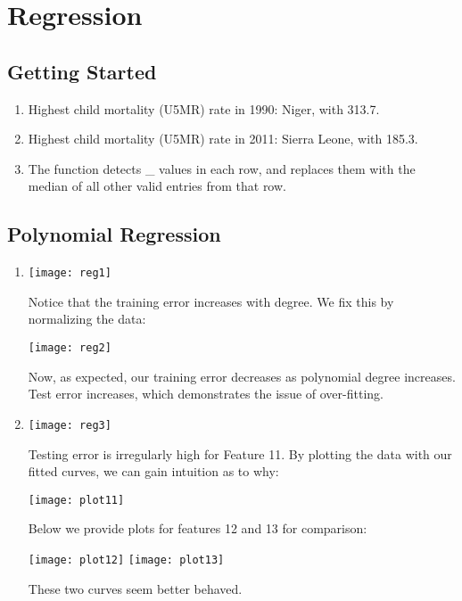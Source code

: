 \documentclass{article}
\begin{document}
\section{Regression}
\subsection{Getting Started}

\begin{enumerate}
\item Highest child mortality (U5MR) rate in 1990: Niger, with 313.7.
\item Highest child mortality (U5MR) rate in 2011: Sierra Leone, with 185.3.
\item The function detects \_ values in each row, and replaces
  them with the median of all other valid entries from that row.
\end{enumerate}

\subsection{Polynomial Regression}

\begin{enumerate}
\item \begin{center}
  \texttt{[image: reg1]}
\end{center}
  Notice that the training error increases with degree. We fix this
  by normalizing the data:
  \begin{center}
      \texttt{[image: reg2]}
  \end{center}
  Now, as expected, our training error decreases as polynomial degree
  increases. Test error increases, which demonstrates the issue
  of over-fitting.
\item \begin{center}
  \texttt{[image: reg3]}
\end{center}
  Testing error is irregularly high for Feature 11. By plotting
  the data with our fitted curves, we can gain intuition as to why:
  \begin{center}
    \texttt{[image: plot11]}
  \end{center}
  Below we provide plots for features 12 and 13 for comparison:
  \begin{center}
    \texttt{[image: plot12]}
    \texttt{[image: plot13]}
  \end{center}
  These two curves seem better behaved.
\end{enumerate}
\end{document}
